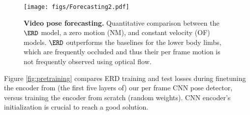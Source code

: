 \documentclass[10pt,twocolumn,letterpaper]{article}
\begin{document}
\begin{figure*}[ht]
\begin{center}
\texttt{[image: figs/Forecasting2.pdf]}
\end{center}
\caption{ \textbf{Video pose forecasting.} Quantitative comparison between the $\ERD$ model, a zero motion (NM), and constant velocity (OF) models. $\ERD$ outperforms the baselines for the lower body limbs, which are frequently occluded and thus their per frame motion is not frequently observed using optical flow. }
\label{fig:forecasting}
\end{figure*}Figure \ref{fig:pretraining} compares ERD training and test losses during finetuning  the encoder from (the first five layers of) our  per frame CNN pose detector, versus training the encoder from scratch (random weights). CNN encoder's  initialization is crucial to reach a good solution.  %
\end{document}
